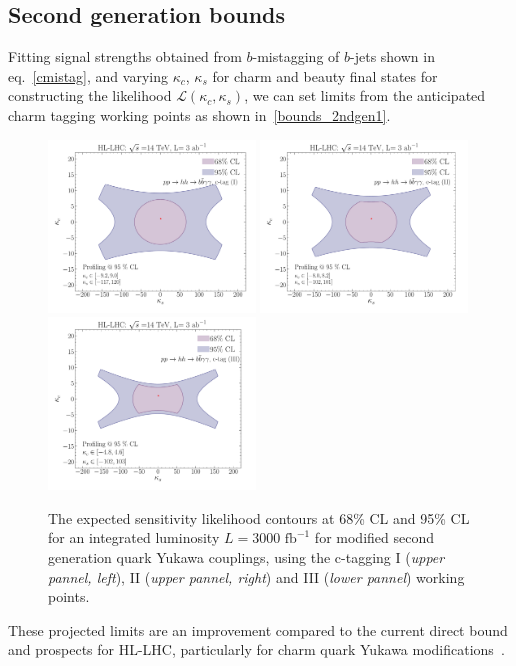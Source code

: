 \subsection{Second generation bounds}
Fitting signal strengths obtained from $b$-mistagging of $b$-jets shown in eq.~\eqref{cmistag}, and varying $\kappa_c$,  $\kappa_s$ for charm and beauty final states for constructing the likelihood $\mathscr{L}(\kappa_c,\kappa_s)$, we can set limits from the anticipated charm tagging working points as shown in~\autoref{bounds_2ndgen1}.
\begin{figure}[!t]
	\centering
	\includegraphics[width = 0.49\textwidth]{./fig/2nd_gen_exclusion_ctag1}
	\includegraphics[width = 0.49\textwidth]{./fig/2nd_gen_exclusion_ctag2}
	\centering
	\includegraphics[width = 0.49\textwidth]{./fig/2nd_gen_exclusion_ctag3}
	\caption{The expected sensitivity likelihood contours at 68\% CL and 95\% CL for an integrated luminosity $L=3000\text{ fb}^{-1}$ for modified second generation quark Yukawa couplings, using the c-tagging I (\textit{upper pannel, left}), II (\textit{upper pannel, right}) and III (\textit{lower pannel}) working points. }
	\label{bounds_2ndgen1}
\end{figure}
These projected limits are an improvement compared to the current direct bound and prospects for HL-LHC, particularly for charm quark Yukawa modifications~\cite{Perez:2015aoa,Perez:2015lra}.
